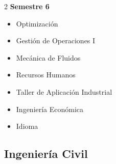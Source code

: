 \documentclass[12pt,a4paper]{article}
\begin{document}
\begin{multicols}{2}
		\textbf{Semestre 6}
		\begin{itemize}
			\item Optimización
			\item Gestión de Operaciones I
			\item Mecánica de Fluidos
			\item Recursos Humanos
			\item Taller de Aplicación Industrial
			\item Ingeniería Económica
			\item Idioma
		\end{itemize}
	\end{multicols}
	
	\newpage
	
	\subsection{Ingeniería Civil}
	
\end{document}
